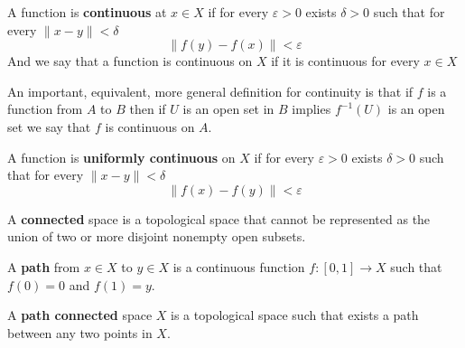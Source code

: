 \documentclass[11pt,a4paper]{article}
\begin{document}
	\begin{definition}
	A function is \textbf{continuous} at $x\in X$ if for every $\varepsilon > 0$
	exists $\delta > 0$ such that for every $\|x-y\| < \delta$
	\[
		\|f(y) - f(x)\| < \varepsilon
	\]
	And we say that a function is continuous on $X$ if it is continuous
	for every $x\in X$
	\end{definition}
	An important, equivalent, more general definition for continuity is that
	if $f$ is a function from $A$ to $B$ then if $U$ is an open set in $B$
	implies $f^{-1}(U)$ is an open set we say that $f$ is continuous on $A$.
	\begin{definition}
	A function is \textbf{uniformly continuous} on $X$ if for every 
	$\varepsilon > 0$ exists $\delta > 0$ such that for every 
	$\|x-y\| < \delta$
	\[
		\|f(x) - f(y)\| < \varepsilon
	\]
	\end{definition}
	\begin{definition}
	A \textbf{connected} space is a topological space that cannot be 
	represented as the union of two or more disjoint nonempty open subsets. 
	\end{definition}
	\begin{definition}
	A \textbf{path} from $x\in X$ to $y\in X$ is a continuous function 
  $f \colon [0,1] \to X$ such that $f(0) = 0$ and $f(1) = y$.
	\end{definition}
	\begin{definition}
	A \textbf{path connected} space $X$ is a topological space such that 
	exists a path between any two points in $X$.
	\end{definition}
	
	\newpage
	
\end{document}
